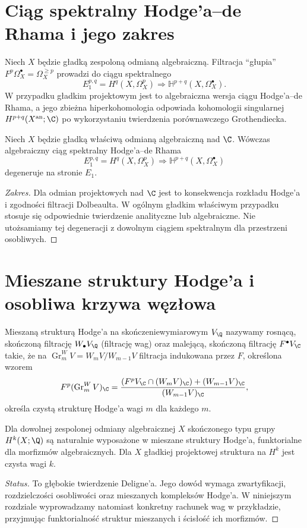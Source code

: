 \section{Ciąg spektralny Hodge'a--de Rhama i jego zakres}
Niech $X$ będzie gładką zespoloną odmianą algebraiczną.
Filtracja ``głupia'' $F^p\Omega_X^\bullet=
\Omega_X^{\ge p}$ prowadzi do ciągu spektralnego
\[
E_1^{p,q}=H^q(X,\Omega_X^p)
\Longrightarrow\mathbb H^{p+q}(X,\Omega_X^\bullet).
\]
W przypadku gładkim projektowym jest to algebraiczna
wersja ciągu Hodge'a--de Rhama, a jego zbieżna
hiperkohomologia odpowiada kohomologii singularnej
$H^{p+q}(X^{\mathrm{an}};\C)$ po wykorzystaniu
twierdzenia porównawczego Grothendiecka.
\begin{twierdzenie}
Niech $X$ będzie gładką właściwą odmianą algebraiczną
nad $\C$. Wówczas algebraiczny ciąg spektralny
Hodge'a--de Rhama
\[
E_1^{p,q}=H^q(X,\Omega_X^p)
\Longrightarrow \mathbb H^{p+q}(X,\Omega_X^\bullet)
\]
degeneruje na stronie $E_1$.
\end{twierdzenie}
\begin{proof}[Zakres]
Dla odmian projektowych nad $\C$ jest to konsekwencja
rozkładu Hodge'a i zgodności filtracji Dolbeaulta.
W ogólnym gładkim właściwym przypadku stosuje się
odpowiednie twierdzenie analityczne lub algebraiczne.
Nie utożsamiamy tej degeneracji z dowolnym
ciągiem spektralnym dla przestrzeni osobliwych.
\end{proof}

\section{Mieszane struktury Hodge'a i osobliwa krzywa węzłowa}
\begin{definicja}
Mieszaną strukturą Hodge'a na skończeniewymiarowym
$V_{\Q}$ nazywamy rosnącą, skończoną filtrację
$W_\bullet V_{\Q}$ (filtrację wag) oraz malejącą,
skończoną filtrację $F^\bullet V_{\C}$ takie, że
na $\operatorname{Gr}_m^WV=W_mV/W_{m-1}V$
filtracja indukowana przez $F$, określona wzorem
\[
F^p(\operatorname{Gr}_m^WV)_{\C}
=\frac{(F^pV_{\C}\cap (W_mV)_{\C})+(W_{m-1}V)_{\C}}
{(W_{m-1}V)_{\C}},
\]
określa czystą strukturę Hodge'a wagi $m$
dla każdego $m$.
\end{definicja}
\begin{twierdzenie}
Dla dowolnej zespolonej odmiany algebraicznej $X$
skończonego typu grupy $H^k(X;\Q)$ są naturalnie
wyposażone w mieszane struktury Hodge'a, funktorialne
dla morfizmów algebraicznych. Dla $X$ gładkiej
projektowej struktura na $H^k$ jest czysta wagi $k$.
\end{twierdzenie}
\begin{proof}[Status]
To głębokie twierdzenie Deligne'a. Jego dowód
wymaga zwartyfikacji, rozdzielczości osobliwości
oraz mieszanych kompleksów Hodge'a. W niniejszym
rozdziale wyprowadzamy natomiast konkretny rachunek
wag w przykładzie, przyjmując funktorialność
struktur mieszanych i ścisłość ich morfizmów.
\end{proof}

